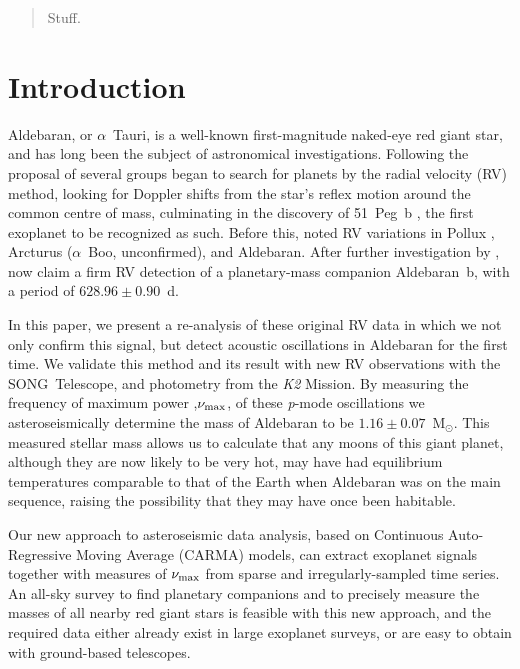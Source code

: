 \documentclass[modern]{aastex61}
\newcommand{\numax}{\mbox{$\nu_{\rm max}$}\xspace}
\newcommand{\msun}{\mbox{$\mathrm{M}_{\odot}$}\xspace}
\newcommand{\ktwo}{\emph{K2}\xspace}
\begin{document}



\begin{abstract}
Stuff.
\end{abstract}

\section{Introduction}

Aldebaran, or $\alpha$~Tauri, is a well-known first-magnitude naked-eye red giant star, and has long been the subject of astronomical investigations. Following the proposal of \citet{struverv} several groups began to search for planets by the radial velocity (RV) method, looking for Doppler shifts from the star's reflex motion around the common centre of mass, culminating in the discovery of 51~Peg~b \citep{51peg}, the first exoplanet to be recognized as such. Before this, \citet{hatzes1993} noted RV variations in Pollux \citep[$\beta$~Gem; subsequently confirmed as a planet:][]{betgemconf,betgemconf2}, Arcturus ($\alpha$~Boo, unconfirmed), and Aldebaran. After further investigation by \citet{Hatzes1998}, \citet{Hatzes2015} now claim a firm RV detection of a planetary-mass companion Aldebaran~b, with a period of $628.96 \pm 0.90$~d. 

In this paper, we present a re-analysis of these original RV data in which we not only confirm this signal, but detect acoustic oscillations in Aldebaran for the first time. We validate this method and its result with new RV observations with the SONG~Telescope, and photometry from the \ktwo Mission. By measuring the frequency of maximum power ,\numax, of these \emph{p}-mode oscillations we asteroseismically determine the mass of Aldebaran to be $1.16 \pm 0.07$~\msun. This measured stellar mass allows us to calculate that any moons of this giant planet, although they are now likely to be very hot, may have had equilibrium temperatures comparable to that of the Earth when Aldebaran was on the main sequence, raising the possibility that they may have once been habitable.

Our new approach to asteroseismic data analysis, based on Continuous Auto-Regressive Moving Average (CARMA) models, can extract exoplanet signals together with measures of \numax from sparse and irregularly-sampled time series. An all-sky survey to find planetary companions and to precisely measure the masses of all nearby red giant stars is feasible with this new approach, and the required data either already exist in large exoplanet surveys, or are easy to obtain with ground-based telescopes.
\end{document}
